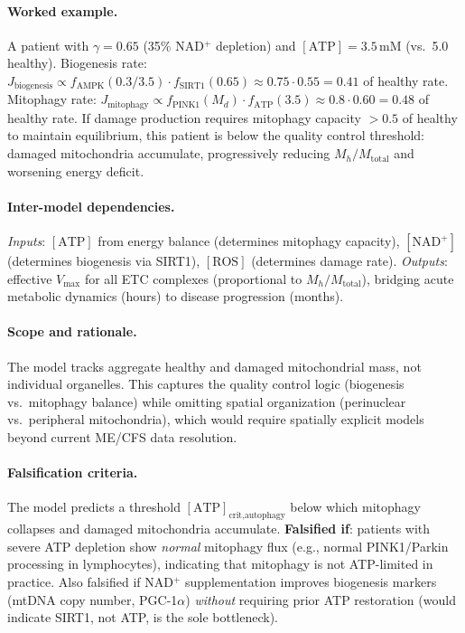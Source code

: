 \paragraph{Worked example.}
A patient with $\gamma = 0.65$ (35\% NAD$^+$ depletion) and $[\text{ATP}] = 3.5$\,mM (vs.\ 5.0 healthy). Biogenesis rate: $J_{\text{biogenesis}} \propto f_{\text{AMPK}}(0.3/3.5) \cdot f_{\text{SIRT1}}(0.65) \approx 0.75 \cdot 0.55 = 0.41$ of healthy rate. Mitophagy rate: $J_{\text{mitophagy}} \propto f_{\text{PINK1}}(M_d) \cdot f_{\text{ATP}}(3.5) \approx 0.8 \cdot 0.60 = 0.48$ of healthy rate. If damage production requires mitophagy capacity $> 0.5$ of healthy to maintain equilibrium, this patient is below the quality control threshold: damaged mitochondria accumulate, progressively reducing $M_h/M_{\text{total}}$ and worsening energy deficit.

\paragraph{Inter-model dependencies.}
\emph{Inputs}: $[\text{ATP}]$ from energy balance (determines mitophagy capacity), $[\text{NAD}^+]$ (determines biogenesis via SIRT1), $[\text{ROS}]$ (determines damage rate). \emph{Outputs}: effective $V_{\max}$ for all ETC complexes (proportional to $M_h/M_{\text{total}}$), bridging acute metabolic dynamics (hours) to disease progression (months).

\paragraph{Scope and rationale.}
The model tracks aggregate healthy and damaged mitochondrial mass, not individual organelles. This captures the quality control logic (biogenesis vs.\ mitophagy balance) while omitting spatial organization (perinuclear vs.\ peripheral mitochondria), which would require spatially explicit models beyond current ME/CFS data resolution.

\paragraph{Falsification criteria.}
The model predicts a threshold $[\text{ATP}]_{\text{crit,autophagy}}$ below which mitophagy collapses and damaged mitochondria accumulate. \textbf{Falsified if}: patients with severe ATP depletion show \emph{normal} mitophagy flux (e.g., normal PINK1/Parkin processing in lymphocytes), indicating that mitophagy is not ATP-limited in practice. Also falsified if NAD$^+$ supplementation improves biogenesis markers (mtDNA copy number, PGC-1$\alpha$) \emph{without} requiring prior ATP restoration (would indicate SIRT1, not ATP, is the sole bottleneck).

